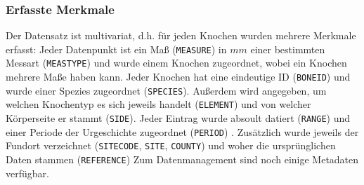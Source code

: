 \subsubsection{Erfasste Merkmale}
Der Datensatz ist multivariat, d.h. für jeden Knochen wurden mehrere Merkmale erfasst:
Jeder Datenpunkt ist ein Maß (\texttt{MEASURE}) in $mm$ einer bestimmten Messart (\texttt{MEASTYPE}) und wurde einem Knochen zugeordnet, wobei ein Knochen mehrere Maße haben kann. 
Jeder Knochen hat eine eindeutige ID (\texttt{BONEID}) und wurde einer Spezies zugeordnet (\texttt{SPECIES}). Außerdem wird angegeben, um welchen Knochentyp es sich jeweils handelt (\texttt{ELEMENT}) und von welcher Körperseite er stammt (\texttt{SIDE}).
Jeder Eintrag wurde absoult datiert (\texttt{RANGE}) und einer Periode der Urgeschichte zugeordnet (\texttt{PERIOD}) . 
Zusätzlich wurde jeweils der Fundort verzeichnet (\texttt{SITECODE}, \texttt{SITE}, \texttt{COUNTY}) und woher die ursprünglichen Daten stammen (\texttt{REFERENCE})
Zum Datenmanagement sind noch einige Metadaten verfügbar.






